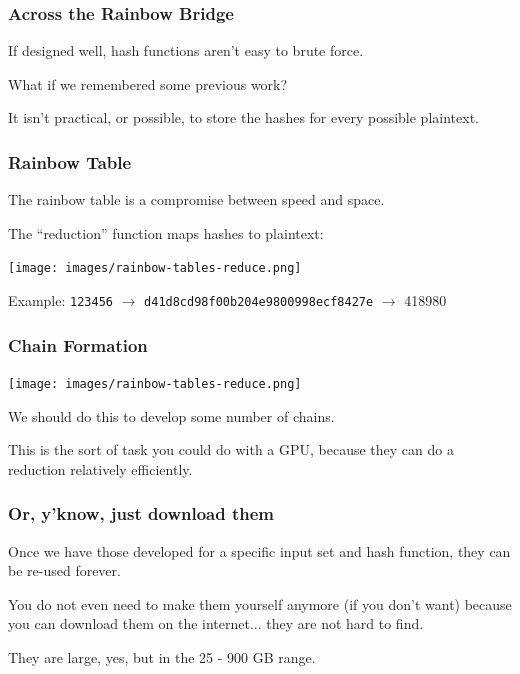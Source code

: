 \begin{frame}
\frametitle{Across the Rainbow Bridge}

If designed well, hash functions aren't easy to brute force.

What if we remembered some previous work? 

It isn't practical, or possible, to store the hashes for every possible plaintext.

\end{frame}


\begin{frame}
\frametitle{Rainbow Table}

The rainbow table is a compromise between speed and space. 

The ``reduction'' function maps hashes to plaintext:

\begin{center}
	\texttt{[image: images/rainbow-tables-reduce.png]}
\end{center}

Example: \texttt{123456} $\rightarrow$ \texttt{d41d8cd98f00b204e9800998ecf8427e} $\rightarrow$ 418980

\end{frame}


\begin{frame}
\frametitle{Chain Formation}

\begin{center}
	\texttt{[image: images/rainbow-tables-reduce.png]}
\end{center}

We should do this to develop some number of chains. 

This is the sort of task you could do with a GPU, because they can do a reduction relatively efficiently. 

\end{frame}


\begin{frame}
\frametitle{Or, y'know, just download them}

Once we have those developed for a specific input set and hash function, they can be re-used forever. 

You do not even need to make them yourself anymore (if you don't want) because you can download them on the internet... they are not hard to find. 

They are large, yes, but in the 25 - 900 GB range. 


\end{frame}


